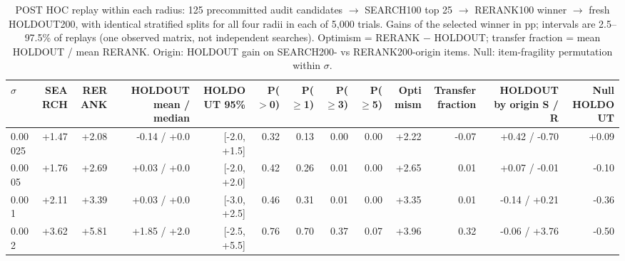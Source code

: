 \begin{table}[t]
\centering
\small
\begin{adjustbox}{max width=\linewidth}
\begin{tabular}{lrrrrrrrrrrrr}
\toprule
$\sigma$ & SEARCH & RERANK & HOLDOUT mean / median & HOLDOUT 95\% & P($>$0) & P($\ge$1) & P($\ge$3) & P($\ge$5) & Optimism & Transfer fraction & HOLDOUT by origin S / R & Null HOLDOUT \\
\midrule
0.00025 & +1.47 & +2.08 & -0.14 / +0.0 & [-2.0, +1.5] & 0.32 & 0.13 & 0.00 & 0.00 & +2.22 & -0.07 & +0.42 / -0.70 & +0.09 \\
0.0005 & +1.76 & +2.69 & +0.03 / +0.0 & [-2.0, +2.0] & 0.42 & 0.26 & 0.01 & 0.00 & +2.65 & 0.01 & +0.07 / -0.01 & -0.10 \\
0.001 & +2.11 & +3.39 & +0.03 / +0.0 & [-3.0, +2.5] & 0.46 & 0.31 & 0.01 & 0.00 & +3.35 & 0.01 & -0.14 / +0.21 & -0.36 \\
0.002 & +3.62 & +5.81 & +1.85 / +2.0 & [-2.5, +5.5] & 0.76 & 0.70 & 0.37 & 0.07 & +3.96 & 0.32 & -0.06 / +3.76 & -0.50 \\
\bottomrule
\end{tabular}
\end{adjustbox}
\caption{POST HOC replay within each radius: 125 precommitted audit candidates $\to$ SEARCH100 top 25 $\to$ RERANK100 winner $\to$ fresh HOLDOUT200, with identical stratified splits for all four radii in each of 5,000 trials. Gains of the selected winner in pp; intervals are 2.5--97.5\% of replays (one observed matrix, not independent searches). Optimism = RERANK $-$ HOLDOUT; transfer fraction = mean HOLDOUT / mean RERANK. Origin: HOLDOUT gain on SEARCH200- vs RERANK200-origin items. Null: item-fragility permutation within $\sigma$.}
\label{tab:radius-transfer}
\end{table}
